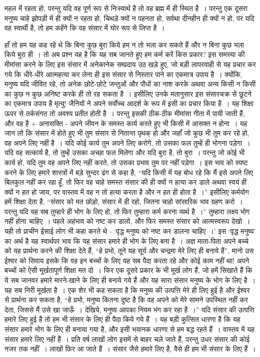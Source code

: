 महल में रहता हो, परन्तु यदि वह पूर्ण रूप से निःस्वार्थ है तो वह ब्रह्म में ही स्थित है~। परन्तु एक दूसरा मनुष्य चाहे झोपड़ी में ही क्यों न रहता हो, चिथड़े क्यों न पहनता हो, सर्वथा दीनहीन ही क्यों न हो, पर यदि वह स्वार्थी है, तो हम कहेंगे कि वह संसार में घोर रूप से लिप्त है~।

हाँ तो हम यह कह रहे थे कि बिना कुछ बुरा किये हम न तो भला कर सकते हैं और न बिना कुछ भला किये बुरा ही~। तो अब प्रश्न यह है कि यह सब जानते हुए हम कर्म करें किस प्रकार? इस समस्या की मीमांसा करने के लिए इस संसार में अनेकानेक सम्प्रदाय उठ खड़े हुए, जो बड़ी लापरवाही से यह प्रचार कर गये कि धीरे-धीरे आत्महत्या कर लेना ही इस संसार से निस्तार पाने का एकमात्र उपाय है~। क्योंकि, मनुष्य यदि जीवित रहे, तो अनेक छोटे-छोटे जन्तुओं और पौधों का नाश करके अथवा अन्य किसी न किसी का कुछ न कुछ अनिष्ट करके ही तो रह सकता है~। इसीलिए उनके मतानुसार इस संसारचक्र से छूटने का एकमात्र उपाय है मृत्यु! जैनियों ने अपने सर्वोच्च आदर्श के रूप में इसी का प्रचार किया है~। यह शिक्षा ऊपर से तर्कसंगत तो अवश्य प्रतीत होती है~। परन्तु इसकी ठीक-ठीक मीमांसा गीता में पायी जाती हैं; और वह है + अनासक्ति - अपने जीवन के समस्त कार्य करते हुए भी किसी में आसक्त न होना~। यह जान लो कि संसार में होते हुए भी तुम संसार से नितान्त पृथक् हो और जहाँ जो कुछ भी तुम कर रहे हो, वह अपने लिए नहीं है~। यदि कोई कार्य तुम अपने लिए करोगे, तो उसका फल तुम्हें ही भोगना पड़ेगा~। यदि वह सत्कार्य है, तो तुम्हें उसका अच्छा फल मिलेगा और यदि बुरा है, तो बुरा~। परन्तु जो कोई भी कार्य हो, यदि तुम वह अपने लिए नहीं करते, तो उसका प्रभाव तुम पर नहीं पड़ेगा~। इस भाव को स्पष्ट करने के लिए हमारे शास्त्रों में बड़े सुन्दर ढंग से कहा है, “यदि किसी में यह बोध रहे कि मैं इसे अपने लिए बिलकुल नहीं कर रहा हूँ, तो फिर वह चाहे समस्त संसार की ही क्यों न हत्या कर डाले अथवा स्वयं ही क्यों न हत हो जाय, पर वास्तव में वह न तो हत्या करता है और न हत ही होता है~।” इसीलिए कर्मयोग हमें शिक्षा देता है, “संसार को मत छोड़ो, संसार में ही रहो, जितना चाहो सांसारिक भाव ग्रहण करो~। परन्तु यदि यह सब तुम्हारे ही भोग के लिए हो, तो फिर तुम्हारा कर्म करना व्यर्थ है~।” तुम्हारा लक्ष्य भोग नहीं होना चाहिए~। पहले अहंभाव को नष्ट कर डालो, और फिर समस्त संसार को आत्मस्वरूप देखो~। यही तो प्राचीन ईसाई लोग भी कहा करते थे - ‘वृद्ध मनुष्य को नष्ट कर डालना चाहिए~।’ इस ‘वृद्ध मनुष्य’ का अर्थ है यह स्वार्थपर भाव कि यह संसार हमारे ही भोग के लिए बना है~। अज्ञ माता-पिता अपने बच्चे को यह प्रार्थना करने की शिक्षा देते हैं, “हे प्रभो, तूने यह सूर्य और चन्द्रमा मेरे लिए ही बनाये हैं”, मानो उस ईश्वर को सिवाय इसके कि वह इन बच्चों के लिए यह सब पैदा करता रहे और कोई काम नहीं था! अपने बच्चों को ऐसी मूर्खतापूर्ण शिक्षा मत दो~। फिर एक दूसरे प्रकार के भी मूर्ख लोग हैं, जो हमें सिखाते हैं कि ये सब जानवर हमारे मारने-खाने के लिए ही बनाये गये हैं और यह सारा संसार मनुष्य के भोग के लिए है~। यह सब निरी मूर्खता है~। एक शेर भी कह सकता है कि मनुष्य की उत्पत्ति मेरे ही लिए हुई है और ईश्वर से प्रार्थना कर सकता है, “हे प्रभो, मनुष्य कितना दुष्ट है कि वह अपने को मेरे सामने उपस्थित नहीं कर देता, जिससे मैं उसे खा जाऊँ~। देखिये, मनुष्य आपका नियम भंग कर रहा है~।” यदि संसार की उत्पत्ति हमारे लिए हुई है तो हम भी संसार के लिए ही पैदा किये गये हैं~। यह बड़ी कुत्सित धारणा है कि यह संसार हमारे भोग के लिए ही बनाया गया है, और इसी भयानक धारणा से हम बद्ध रहते हैं~। वास्तव में यह संसार हमारे लिए नहीं हैं~। प्रति वर्ष लाखों लोग इसमें से बाहर चले जाते हैं, परन्तु उधर संसार की कोई नजर तक नहीं~। लाखों फिर आ जाते हैं~। संसार जैसे हमारे लिए है, वैसे ही हम भी संसार के लिए हैं~।

